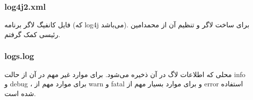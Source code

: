 \documentclass[12pt]{article}
\begin{document}
\LTR
\begin{latin}
\subsubsection*{log4j2.xml}
\end{latin}
\RTL
فایل کانفیگ لاگر برنامه (که log4j می‌باشد). برای ساخت لاگر و تنظیم آن از محمدامین رئیسی کمک گرفتم.

\LTR
\begin{latin}
\subsubsection*{logs.log}
\end{latin}
\RTL
محلی که اطلاعات لاگ در آن ذخیره می‌شود. برای موارد غیر مهم در آن از حالت info و debug ، برای موارد مهم از warn و fatal و برای موارد بسیار مهم از error استفاده شده است.
\end{document}
